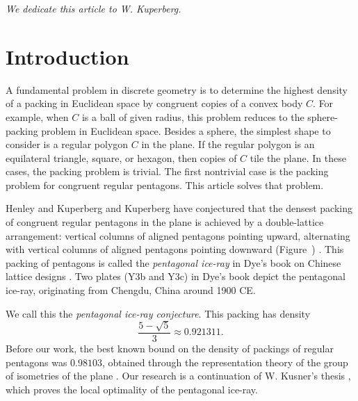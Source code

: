 \def\penp#1#2{%
\draw[red] (#1) + (#2:1cm) -- + (#2+72:1cm) -- 
  +(#2+144:1cm) -- +(#2+216:1cm) -- + (#2+288:1cm) -- cycle
}


\def\threepent#1#2#3#4#5#6#7#8#9{%
\pen{#1}{#2}{#3};
\pen{#4}{#5}{#6};
\pen{#7}{#8}{#9};
\draw[blue] (#1,#2) -- (#4,#5) -- (#7,#8) -- cycle
}

\def\threepentnoD#1#2#3#4#5#6#7#8#9{%
\pen{#1}{#2}{#3};
\pen{#4}{#5}{#6};
\pen{#7}{#8}{#9}
}

\def\blankfig#1{\tikzfig{#1}{Insert graphic}
{
[scale=1]
\draw(0,) circle(1cm);
}}



\centerline{\it We dedicate this article to W. Kuperberg.}

\section{Introduction}\label{sec:intro} 

A fundamental problem in discrete geometry is to determine the highest
density of a packing in Euclidean space by congruent copies of a
convex body $C$.  For example, when $C$ is a ball of given radius,
this problem reduces to the sphere-packing problem in Euclidean space.
Besides a sphere, the simplest shape to consider is a regular polygon
$C$ in the plane.  If the regular polygon is an equilateral
triangle, square, or hexagon, then copies of $C$ tile the plane.  In
these cases, the packing problem is trivial.  The first nontrivial
case is the packing problem for congruent regular pentagons.  This
article solves that problem.

Henley and Kuperberg and Kuperberg have conjectured that the densest
packing of congruent regular pentagons in the plane is achieved by a
double-lattice arrangement: vertical columns of aligned pentagons
pointing upward, alternating with vertical columns of aligned
pentagons pointing downward (Figure~)
\cite{Kup} \cite[p.801]{henley}.  This packing of pentagons is called
the {\it pentagonal ice-ray} in Dye's book on Chinese lattice designs
\cite{dye}.  Two plates (Y3b and Y3c) in Dye's book depict the
pentagonal ice-ray, originating from Chengdu, China around 1900 CE.

We call this the {\it pentagonal ice-ray  conjecture}.
This packing has density
\[
\frac{5 - \sqrt{5}}3 \approx 0.921311.
\] %
Before our work, the best known bound on the density of packings of
regular pentagons was $0.98103$, obtained through the representation
theory of the group of isometries of the plane \cite{Val}.  Our
research is a continuation of W. Kusner's thesis \cite{Kus}, which
proves the local optimality of the pentagonal ice-ray.

